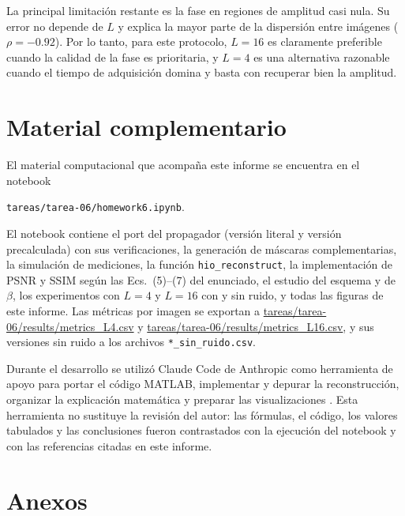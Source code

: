 \documentclass[11pt,a4paper]{article}
\begin{document}
La principal limitación restante es la fase en regiones de amplitud casi nula. Su error no depende de $L$ y explica la mayor parte de la dispersión entre imágenes ($\rho=-0.92$). Por lo tanto, para este protocolo, $L=16$ es claramente preferible cuando la calidad de la fase es prioritaria, y $L=4$ es una alternativa razonable cuando el tiempo de adquisición domina y basta con recuperar bien la amplitud.

\section{Material complementario}

El material computacional que acompaña este informe se encuentra en el notebook
\begin{center}
\texttt{tareas/tarea-06/homework6.ipynb}.
\end{center}
El notebook contiene el port del propagador (versión literal y versión precalculada) con sus verificaciones, la generación de máscaras complementarias, la simulación de mediciones, la función \texttt{hio\_reconstruct}, la implementación de PSNR y SSIM según las Ecs.~(5)--(7) del enunciado, el estudio del esquema y de $\beta$, los experimentos con $L=4$ y $L=16$ con y sin ruido, y todas las figuras de este informe. Las métricas por imagen se exportan a \url{tareas/tarea-06/results/metrics_L4.csv} y \url{tareas/tarea-06/results/metrics_L16.csv}, y sus versiones sin ruido a los archivos \texttt{*\_sin\_ruido.csv}.

Durante el desarrollo se utilizó Claude Code de Anthropic como herramienta de apoyo para portar el código MATLAB, implementar y depurar la reconstrucción, organizar la explicación matemática y preparar las visualizaciones \cite{claude-code}. Esta herramienta no sustituye la revisión del autor: las fórmulas, el código, los valores tabulados y las conclusiones fueron contrastados con la ejecución del notebook y con las referencias citadas en este informe.

\clearpage
\renewcommand{\refname}{Referencias}


\newpage

\appendix
\section{Anexos}
\label{app:anexos}
\end{document}
